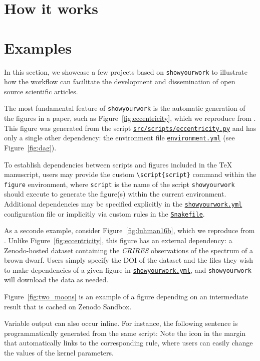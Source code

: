 \documentclass{aastex631}
\newcommand\syw{\texttt{showyourwork}\xspace}
\newcommand\repoargurl{https://github.com/showyourwork/showyourwork-paper}
\newcommand\fileurl[1]{\repoargurl/blob/\GitHubSHA/#1}
\newcommand\repoargfile[1]{\href{\fileurl{#1}}{\texttt{#1}\xspace}}
\newcommand\figenv{\texttt{figure}\xspace}
\newcommand\scriptcmd{\texttt{\textbackslash script\{{\color{lsthilite}script}\}}\xspace}
\newcommand\scriptarg{\texttt{\color{lsthilite}script}\xspace}
\begin{document}
\section{How it works}
\label{sec:how-it-works}

\section{Examples}
\label{sec:examples}
In this section, we showcase a few projects based on \syw to illustrate how the workflow can facilitate the development and dissemination of open source scientific articles.

The most fundamental feature of \syw is the automatic generation of the figures in a paper, such as Figure~\ref{fig:eccentricity}, which we reproduce from \citet{Wagg2022}.
This figure was generated from the script \repoargfile{src/scripts/eccentricity.py} and has only a single other dependency: the \conda environment file \repoargfile{environment.yml} (see Figure~\ref{fig:dag}).

To establish dependencies between scripts and figures included in the TeX manuscript, users may provide the custom \scriptcmd command within the \figenv environment, where \scriptarg is the name of the script \syw should execute to generate the figure(s) within the current environment.
Additional dependencies may be specified explicitly in the \repoargfile{showyourwork.yml} configuration file or implicitly via custom rules in the \repoargfile{Snakefile}.

As a seconde example, consider Figure~\ref{fig:luhman16b}, which we reproduce from \citet{Luger2021c}. 
Unlike Figure~\ref{fig:eccentricity}, this figure has an external dependency: a Zenodo-hosted dataset containing the \emph{CRIRES} observations of the spectrum of a brown dwarf.
Users simply specify the DOI of the dataset and the files they wish to make dependencies of a given figure in \repoargfile{showyourwork.yml}, and \syw will download the data as needed.

Figure~\ref{fig:two_moons} is an example of a figure depending on an intermediate result that is cached on Zenodo Sandbox.

Variable output can also occur inline. For instance, the following sentence is programmatically generated from the same script: 
Note the icon in the margin that automatically links to the corresponding \snakemake rule, where users can easily change the values of the kernel parameters.
\end{document}

